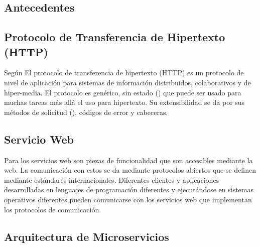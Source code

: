 
\subsection{Antecedentes}

%
%
%

\subsection{Protocolo de Transferencia de Hipertexto (HTTP)}
Según \cite{goralski2017illustrated} El protocolo de transferencia de hipertexto (HTTP) es un protocolo de nivel de aplicación para sistemas de información
distribuidos, colaborativos y de hiper-media.
El protocolo es genérico, sin estado () que puede ser usado para muchas tareas más allá el uso para hipertexto.
Su extensibilidad se da por sus métodos de solicitud (), códigos de error y cabeceras.

\subsection{Servicio Web}

Para \cite{bruijin2006web} los servicios web son piezas de funcionalidad que son accesibles mediante la web.
La comunicación con estos se da mediante protocolos abiertos que se definen mediante estándares internacionales.
Diferentes clientes y aplicaciones desarrolladas en lenguajes de programación diferentes y ejecutándose
en sistemas operativos diferentes pueden comunicarse con los servicios web que implementan
los protocolos de comunicación.

\subsection{Arquitectura de Microservicios}


